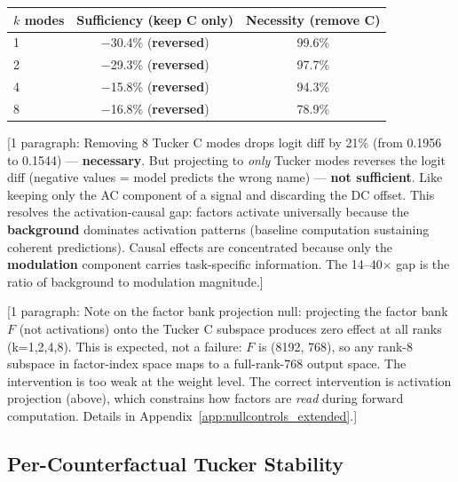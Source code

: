 \documentclass[11pt]{article}
\begin{document}
\begin{center}
\small
\begin{tabular}{lcc}
\toprule
$k$ modes & Sufficiency (keep C only) & Necessity (remove C) \\
\midrule
1 & $-$30.4\% (\textbf{reversed}) & 99.6\% \\
2 & $-$29.3\% (\textbf{reversed}) & 97.7\% \\
4 & $-$15.8\% (\textbf{reversed}) & 94.3\% \\
8 & $-$16.8\% (\textbf{reversed}) & 78.9\% \\
\bottomrule
\end{tabular}
\end{center}

[1 paragraph: Removing 8 Tucker C modes drops logit diff by 21\%
(from 0.1956 to 0.1544) --- \textbf{necessary}. But projecting to
\emph{only} Tucker modes reverses the logit diff (negative values =
model predicts the wrong name) --- \textbf{not sufficient}. Like
keeping only the AC component of a signal and discarding the DC offset.
This resolves the activation-causal gap: factors activate universally
because the \textbf{background} dominates activation patterns (baseline
computation sustaining coherent predictions). Causal effects are
concentrated because only the \textbf{modulation} component carries
task-specific information. The 14--40$\times$ gap is the ratio of
background to modulation magnitude.]


[1 paragraph: Note on the factor bank projection null: projecting the
factor bank $F$ (not activations) onto the Tucker C subspace produces
zero effect at all ranks (k=1,2,4,8). This is expected, not a failure:
$F$ is (8192, 768), so any rank-8 subspace in factor-index space maps
to a full-rank-768 output space. The intervention is too weak at the
weight level. The correct intervention is activation projection (above),
which constrains how factors are \emph{read} during forward computation.
Details in Appendix~\ref{app:nullcontrols_extended}.]

\subsection{Per-Counterfactual Tucker Stability}
\end{document}
